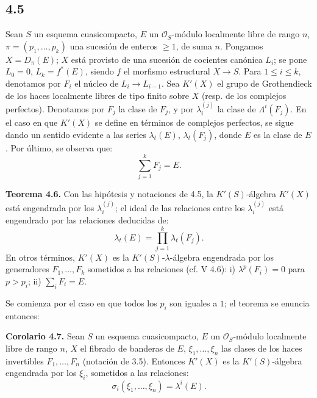 \providecommand{\sisi}[2]{#2}

\subsection*{4.5}
Sean \(S\) un esquema cuasicompacto, \(E\) un \(\mathcal O_S\)-módulo localmente libre de rango \(n\), \(\pi=(p_1,\ldots,p_k)\) una sucesión de enteros \(\geq1\), de suma \(n\). Pongamos \(X=D_\pi(E)\); \(X\) está provisto de una sucesión de cocientes canónica \(L_i\); se pone \(L_0=0\), \(L_k=f^*(E)\), siendo \(f\) el morfismo estructural \(X\to S\). Para \(1\le i\le k\), denotamos por \(F_i\) el núcleo de \(L_i\to L_{i-1}\). Sea \(K'(X)\) el grupo de Grothendieck de los haces localmente libres de tipo finito sobre \(X\) (resp. de los complejos perfectos). Denotamos por \(F_j\) la clase de \(F_j\), y por \(\lambda_i^{(j)}\) la clase de \(\Lambda^i(F_j)\). En el caso en que \(K'(X)\) se define en términos de complejos perfectos, se sigue dando un sentido evidente a las series \(\lambda_t(E)\), \(\lambda_t(F_j)\), donde \(E\) es la clase de \(E\). Por último, se observa que:
\[
  \sum_{j=1}^{k}F_j=E.
\]

\textbf{Teorema 4.6.} Con las hipótesis y notaciones de 4.5, la \(K'(S)\)-álgebra \(K'(X)\) está engendrada por los \(\lambda_i^{(j)}\); el ideal de las relaciones entre los \(\lambda_i^{(j)}\) está engendrado por las relaciones deducidas de:
\[
  \lambda_t(E)=\prod_{j=1}^{k}\lambda_t(F_j).
\]
En otros términos, \(K'(X)\) es la \(K'(S)\)-\(\lambda\)-álgebra engendrada por los generadores \(F_1,\ldots,F_k\) sometidos a las relaciones (cf. V 4.6): i) \(\lambda^p(F_i)=0\) para \(p>p_i\); ii) \(\sum_i F_i=E\).

Se comienza por el caso en que todos los \(p_i\) son iguales a \(1\); el teorema se enuncia entonces:

\textbf{Corolario 4.7.} Sean \(S\) un esquema cuasicompacto, \(E\) un \(\mathcal O_S\)-módulo localmente \sisi{}{libre }de rango \(n\), \(X\) el fibrado de banderas de \(E\), \(\xi_1,\ldots,\xi_n\) las clases de los haces invertibles \(F_1,\ldots,F_n\) (notación de 3.5). Entonces \(K'(X)\) es la \(K'(S)\)-álgebra engendrada por los \(\xi_i\), sometidos a las relaciones:
\[
  \sigma_i(\xi_1,\ldots,\xi_n)=\lambda^i(E).
\]


